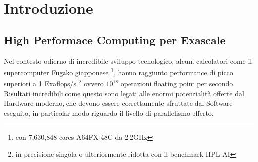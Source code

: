 \chapter{Introduzione}
\label{ChIntro}

\section{High Performace Computing per Exascale}
Nel contesto odierno di incredibile sviluppo tecnologico, alcuni calcolatori 
come il supercomputer Fugako giapponese \footnote{con 7,630,848 cores A64FX 48C da 2.2GHz},
hanno raggiunto performance di picco superiori a 1 Exaflops/s 
\footnote{in precisione singola o ulteriormente ridotta con il benchmark HPL-AI}
 ovvero $10^{18}$ operazioni floating point per secondo.\\
\voidLine
Risultati incredibili come questo sono legati alle enormi potenzialità offerte dal Hardware moderno,
che devono essere correttamente sfruttate dal Software eseguito, 
in particolar modo riguardo il livello di parallelismo offerto.\\

